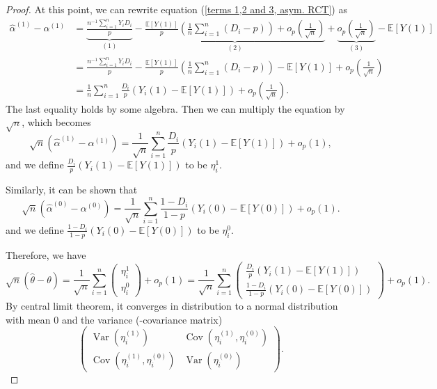 \documentclass[11pt,a4paper]{amsart}
\theoremstyle{plain}
\theoremstyle{definition}
\begin{document}
\begin{proof}
	 At this point, we can rewrite equation (\ref{terms 1,2 and 3, asym. RCT}) as 
	 \[	\begin{aligned}
		\hat{\alpha}^{(1)} - \alpha^{(1)} &=  \underbrace{\frac{n^{-1}\sum_{i = 1}^{n}Y_{i}D_{i}}{p}}_{(1)} - \underbrace{\frac{\mathbb{E}[Y(1)]}{p}(\frac{1}{n}\sum_{i = 1}^{n} (D_{i} - p))+ o_{p}(\frac{1}{\sqrt{n}})}_{(2)} + \underbrace{o_{p}(\frac{1}{\sqrt{n}})}_{(3)}	 - \mathbb{E}[Y(1)]	\\
		&= \frac{n^{-1}\sum_{i = 1}^{n}Y_{i}D_{i}}{p} - \frac{\mathbb{E}[Y(1)]}{p}(\frac{1}{n}\sum_{i = 1}^{n} (D_{i} - p)) - \mathbb{E}[Y(1)] + o_{p}(\frac{1}{\sqrt{n}}) \\
		&= \frac{1}{n}\sum_{i = 1}^{n} \frac{D_{i}}{p}(Y_{i}(1) - \mathbb{E}[Y(1)]) + o_{p}(\frac{1}{\sqrt{n}}).
	 \end{aligned}	\]
	 The last equality holds by some algebra. Then we can multiply the equation by $\sqrt{n}$, which becomes
	 \[	\sqrt{n}(\hat{\alpha}^{(1)} - \alpha^{(1)}) = \frac{1}{\sqrt{n}}\sum_{i = 1}^{n} \frac{D_{i}}{p}(Y_{i}(1) - \mathbb{E}[Y(1)]) + o_{p}(1),	\] 
	 and we define $\frac{D_{i}}{p}(Y_{i}(1) - \mathbb{E}[Y(1)]) $ to be $\eta_{i}^{1}$. \par 
	 Similarly, it can be shown that 
	  \[	\sqrt{n}(\hat{\alpha}^{(0)} - \alpha^{(0)}) = \frac{1}{\sqrt{n}}\sum_{i = 1}^{n} \frac{1-D_{i}}{1-p}(Y_{i}(0) - \mathbb{E}[Y(0)]) + o_{p}(1).	\] 
	 and we define $ \frac{1-D_{i}}{1-p}(Y_{i}(0) - \mathbb{E}[Y(0)])$ to be $\eta_{i}^{0}$. \par 
	 Therefore, we have 
	 \[	\sqrt{n}(\hat{\theta} - \theta) = \frac{1}{\sqrt{n}} \sum_{i=1}^{n} \begin{pmatrix}
	 \eta_{i}^{1} \\
	 \eta_{i}^{0}
	 \end{pmatrix} + o_{p}(1)=
	 \frac{1}{\sqrt{n}} \sum_{i=1}^{n}
	 \begin{pmatrix}
	  \frac{D_{i}}{p}(Y_{i}(1) - \mathbb{E}[Y(1)]) \\
	  \frac{1-D_{i}}{1-p}(Y_{i}(0) - \mathbb{E}[Y(0)])
	 \end{pmatrix} + o_{p}(1).	\]
	 By central limit theorem, it converges in distribution to a normal distribution with mean $0$ and the variance (-covariance matrix) 
	 \[ \begin{pmatrix}
	 \operatorname{Var} (\eta_{i}^{(1)}) &  \operatorname{Cov}(\eta_{i}^{(1)},\eta_{i}^{(0)})\\
	 \operatorname{Cov}(\eta_{i}^{(1)},\eta_{i}^{(0)}) &  \operatorname{Var} (\eta_{i}^{(0)}) 
	 \end{pmatrix}.	\]

\end{proof}
\end{document}
